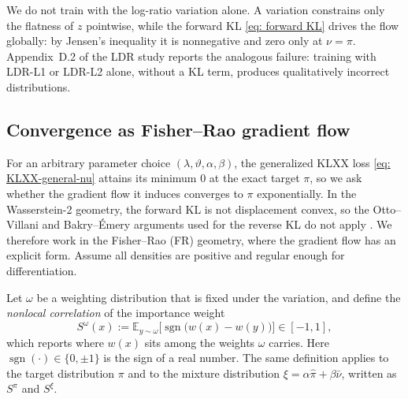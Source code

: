 \documentclass{article}
\begin{document}
\begin{remark}
	We do not train with the log-ratio variation alone. A variation constrains only the flatness of $z$ pointwise, while the forward KL \eqref{eq: forward KL} drives the flow globally: by Jensen's inequality it is nonnegative and zero only at $\nu=\pi$. Appendix~D.2 of the LDR study \citep{schopmans2026ldr} reports the analogous failure: training with LDR-L1 or LDR-L2 alone, without a KL term, produces qualitatively incorrect distributions.
\end{remark}

\subsection{Convergence as Fisher--Rao gradient flow}
\label{subsec: FR-convergence}

For an arbitrary parameter choice $(\lambda,\vartheta,\alpha,\beta)$, the generalized KLXX loss \eqref{eq: KLXX-general-nu} attains its minimum $0$ at the exact target $\pi$, so we ask whether the gradient flow it induces converges to $\pi$ exponentially.
In the Wasserstein-2 geometry, the forward KL is not displacement convex, so the Otto--Villani and Bakry--{\'E}mery arguments used for the reverse KL do not apply \citep{otto2000generalization,bakry2014analysis}. We therefore work in the Fisher--Rao (FR) geometry, where the gradient flow has an explicit form. Assume all densities are positive and regular enough for differentiation.

Let $\omega$ be a weighting distribution that is fixed under the variation, and define the \emph{nonlocal correlation} of the importance weight
\begin{equation}
	S^{\omega}(x) := \mathbb E_{y\sim\omega}\bigl[\operatorname{sgn}\bigl(w(x)-w(y)\bigr)\bigr] \in [-1,1],
	\label{eq: FR-S}
\end{equation}
which reports where $w(x)$ sits among the weights $\omega$ carries. Here $\operatorname{sgn}(\cdot)\in\{0,\pm1\}$ is the sign of a real number.
The same definition applies to the target distribution $\pi$ and to the mixture distribution $\xi=\alpha\hat\pi+\beta\bar\nu$, written as $S^{\pi}$ and $S^{\xi}$.
\end{document}
